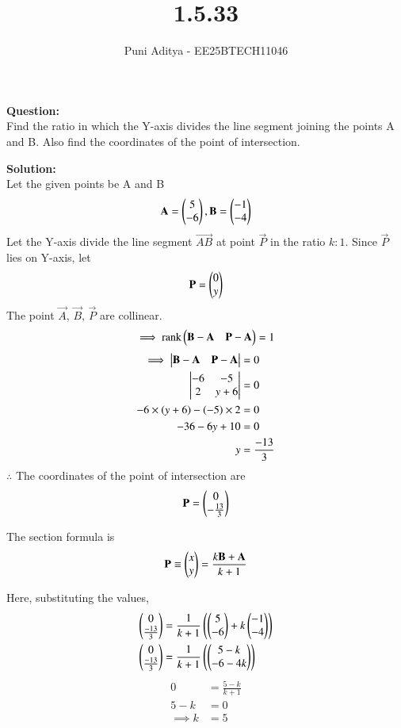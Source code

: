 \documentclass[journal]{IEEEtran}
\begin{document}
\title{1.5.33}
\author{Puni Aditya - EE25BTECH11046}
\maketitle

\textbf{Question:}\\
Find the ratio in which the Y-axis divides the line segment joining the points A and B. Also find the coordinates of the point of intersection.

\textbf{Solution:}\\
Let the given points be A and B
\begin{align*} \mathbf{A} = \begin{pmatrix}5 \\ -6\end{pmatrix}, \mathbf{B} = \begin{pmatrix}-1 \\ -4\end{pmatrix} \end{align*}
Let the Y-axis divide the line segment $\vec{AB}$ at point $\vec{P}$ in the ratio $k:1$.
Since $\vec{P}$ lies on Y-axis, let
\begin{align*}
\mathbf{P} = \begin{pmatrix}0 \\ y\end{pmatrix}
\end{align*}
The point $\vec{A}$, $\vec{B}$, $\vec{P}$ are collinear.
\begin{align}
\implies \text{rank}\begin{pmatrix}\mathbf{B}-\mathbf{A} & \mathbf{P}-\mathbf{A}\end{pmatrix} = 1
\end{align}
\begin{align}
\implies \begin{vmatrix}\mathbf{B}-\mathbf{A} & \mathbf{P}-\mathbf{A}\end{vmatrix} &= 0 \\
\begin{vmatrix}-6 & -5 \\ 2 & y+6\end{vmatrix} &= 0 \\
-6 \times \left(y+6\right) - \left(-5\right) \times 2 &= 0 \\
-36 - 6y + 10 &= 0 \\
y &= \frac{-13}{3}
\end{align}
$\therefore$ The coordinates of the point of intersection are 
\begin{align*}
\mathbf{P} = \begin{pmatrix}0 \\ -\frac{13}{3}\end{pmatrix}
\end{align*}

The section formula is
\begin{align}
    \mathbf{P} \equiv \begin{pmatrix}x \\ y\end{pmatrix} = \frac{k\mathbf{B} + \mathbf{A}}{k+1}
\end{align}

Here, substituting the values,
\begin{align}
    \begin{pmatrix}0 \\ \frac{-13}{3}\end{pmatrix} &= \frac{1}{k+1}\left(\begin{pmatrix}5 \\ -6\end{pmatrix}+k\begin{pmatrix}-1 \\ -4\end{pmatrix}\right) \\
    \begin{pmatrix}0 \\ \frac{-13}{3}\end{pmatrix} &= \frac{1}{k+1}\left(\begin{pmatrix}5-k \\ -6-4k\end{pmatrix}\right) \\
\end{align}
\begin{align}
0 &= \frac{5-k}{k+1} \\
5-k &= 0 \\
\implies k &= 5
\end{align}
\end{document}
